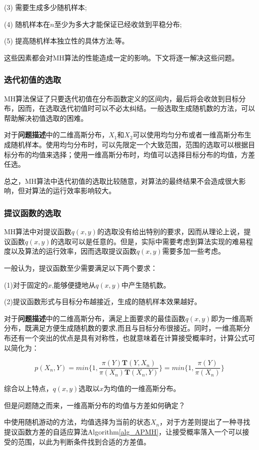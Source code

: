 \documentclass[11pt]{article}
\begin{document}
(3) 需要生成多少随机样本;

(4) 随机样本在$n$至少为多大才能保证已经收敛到平稳分布;

(5) 提高随机样本独立性的具体方法;等。

这些因素都会对MH算法的性能造成一定的影响。下文将逐一解决这些问题。

\subsubsection{迭代初值的选取}
MH算法保证了只要迭代初值在分布函数定义的区间内，最后将会收敛到目标分布，因而，在选取迭代初值时可以不必太纠结。一般选取生成随机数的方法，可以帮助解决初值选取的困难。

对于\textbf{问题描述}中的二维高斯分布，$X_{1}$和$X_{2}$可以使用均匀分布或者一维高斯分布生成随机样本。使用均匀分布时，可以先限定一个大致范围，范围的选取可以根据目标分布的均值来选择；使用一维高斯分布时，均值可以选择目标分布的均值，方差任选。

总之，MH算法中迭代初值的选取比较随意，对算法的最终结果不会造成很大影响，但对算法的运行效率影响较大。

\subsubsection{提议函数的选取}
MH算法中对提议函数$q(x,y)$的选取没有给出特别的要求，因而从理论上说，提议函数$q(x,y)$的选取可以是任意的。但是，实际中需要考虑到算法实现的难易程度以及算法的运行效率，因而选取提议函数$q(x,y)$需要多加一些考虑。

一般认为，提议函数至少需要满足以下两个要求\cite{MH_A}：

(1)对于固定的$x$,能够便捷地从$q(x,y)$中产生随机数。

(2)提议函数形式与目标分布越接近，生成的随机样本效果越好。

对于\textbf{问题描述}中的二维高斯分布，满足上面要求的最佳函数$q(x,y)$即为一维高斯分布，既满足方便生成随机数的要求,而且与目标分布很接近。同时，一维高斯分布还有一个突出的优点是具有对称性，也就意味着在计算接受概率时，计算公式可以简化为：

\[p(X_{n},Y)=min\{1,\frac{\pi(Y)\mathbf{T}(Y,X_{n})}{\pi(X_{n})\mathbf{T}(X_{n},Y)}\}=min\{1,\frac{\pi(Y)}{\pi(X_{n})}\}\]

综合以上特点，$q(x,y)$选取以$x$为均值的一维高斯分布。

但是问题随之而来，一维高斯分布的均值与方差如何确定？

\cite{MH_A}中使用随机游动的方法，均值选择为当前的状态$X_{n}$，对于方差则提出了一种寻找提议函数方差的自适应算法Algorithm\ref{alg_APMH}，让接受概率落入一个可以接受的范围，以此为判断条件找到合适的方差值。
\end{document}
